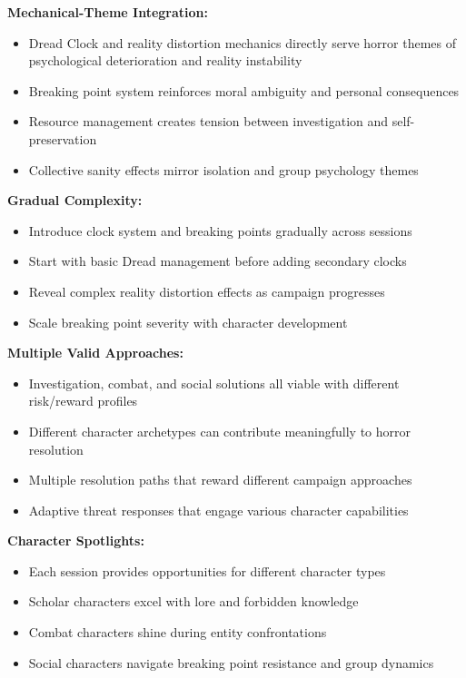 \documentclass[11pt]{article}
\begin{document}
\textbf{Mechanical-Theme Integration:}
\begin{itemize}
\item Dread Clock and reality distortion mechanics directly serve horror themes of psychological deterioration and reality instability
\item Breaking point system reinforces moral ambiguity and personal consequences
\item Resource management creates tension between investigation and self-preservation
\item Collective sanity effects mirror isolation and group psychology themes
\end{itemize}

\textbf{Gradual Complexity:}
\begin{itemize}
\item Introduce clock system and breaking points gradually across sessions
\item Start with basic Dread management before adding secondary clocks
\item Reveal complex reality distortion effects as campaign progresses
\item Scale breaking point severity with character development
\end{itemize}

\textbf{Multiple Valid Approaches:}
\begin{itemize}
\item Investigation, combat, and social solutions all viable with different risk/reward profiles
\item Different character archetypes can contribute meaningfully to horror resolution
\item Multiple resolution paths that reward different campaign approaches
\item Adaptive threat responses that engage various character capabilities
\end{itemize}

\textbf{Character Spotlights:}
\begin{itemize}
\item Each session provides opportunities for different character types
\item Scholar characters excel with lore and forbidden knowledge
\item Combat characters shine during entity confrontations
\item Social characters navigate breaking point resistance and group dynamics
\end{itemize}
\end{document}
